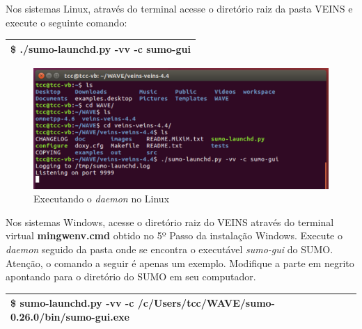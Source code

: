 \documentclass[
12pt,				%
openright,			%
oneside,			%
a4paper,			%
brazil,				%
]{abntex2}
\begin{document}
{\begin{anexosenv}
                \par Nos sistemas Linux, através do terminal acesse o diretório raiz da pasta VEINS e execute o seguinte comando:
		
	            \begin{table}[H]
		            \renewcommand{\arraystretch}{1.5}
	                \begin{tabular}{|p{15.5cm}|}
		                \hline
                        \$ ./sumo-launchd.py -vv -c sumo-gui \\
		                \hline
		            \end{tabular}
	            \end{table}
		            
                \begin{figure} [H]
	                \centering
	                \includegraphics[scale=.29]{figuras/aneB/63DaemonLinux}
	                \caption{\label{fig_63}Executando o \textit{daemon} no Linux}
                \end{figure}
                
                \par Nos sistemas Windows, acesse o diretório raiz do VEINS através do terminal virtual \textbf{mingwenv.cmd} obtido no 5º Passo da instalação Windows. Execute o \textit{daemon} seguido da pasta onde se encontra o executável \textit{sumo-gui} do SUMO. Atenção, o comando a seguir é apenas um exemplo. Modifique a parte em negrito apontando para o diretório do SUMO em seu computador. %
		
	            \begin{table}[H]
		            \renewcommand{\arraystretch}{1.5}
	                \begin{tabular}{|p{15.5cm}|}
		                \hline
                        \$ sumo-launchd.py -vv -c \textbf{/c/Users/tcc/}WAVE/sumo-0.26.0/bin/sumo-gui.exe \\
		                \hline
		            \end{tabular}
	            \end{table}
                

\end{anexosenv}}
\end{document}
